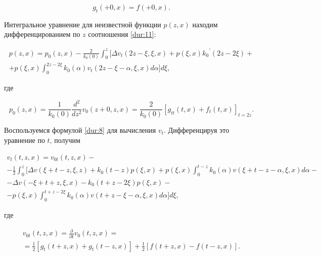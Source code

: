 \[{g_t}( + 0,x) = f( + 0,x).\]



 Интегральное уравнение для неизвестной  функции $p(z,x)$ находим дифференцированием по $z$ соотношения \eqref{dur:11}:

\begin{multline}

p(z,x) = {p_0}(z,x)

- \frac{2}{k_0(0)}\int_0^z [ \Delta v_t(2z - \xi ,\xi ,x) + p(\xi ,x){k_0}^\prime (2z - 2\xi )+

\\

+ p(\xi ,x)\int_0^{2z - 2\xi } k_0(\alpha )v_t(2z - \xi  - \alpha ,\xi ,x)d\alpha]d\xi ,

\label{dur:12}

\end{multline}

где

\[{p_0}(z,x) = \frac{1}{k_0(0)}\frac{d^2}{dz^2}{v_0}(z + 0,z,x)

 = \frac{2}{{{k_0}(0)}}{\left[ {{g_{tt}}(t,x) + {f_t}(t,x)} \right]_{t = 2z}}.\]

Воспользуемся формулой \eqref{dur:8} для вычисления $v_t$. Дифференцируя  это уравнение по $t$, получим

\begin{multline}

{v_t}(t,z,x) = {v_{0t}}(t,z,x) - 

\\

-\frac 12 \int_0^z [\Delta v(\xi+t-z,\xi,z)+k_0(t-z)p(\xi,x)+p(\xi,x)\int_0^{t-z}k_0(\alpha )v(\xi+t-z-\alpha,\xi,x)d\alpha- 

\\

-\Delta v(-\xi+t+z,\xi,x)-k_0(t+z-2\xi)p(\xi,x)-

\\

-p(\xi,x)\int_0^{t+z-2\xi}k_0(\alpha)v(t+z-\xi-\alpha,\xi,x)d\alpha]d\xi, 

\label{dur:13}

\end{multline}

где

\begin{multline*}

{v_{0t}}(t,z,x) = \frac{\partial }{{\partial t}}{v_0}(t,z,x) = \\ = \frac 12 \left[ {{g_t}(t + z,x) + {g_t}(t - z,x)} \right] + \frac 12 \left[ {f(t + z,x) - f(t - z,x)} \right].

\end{multline*}



